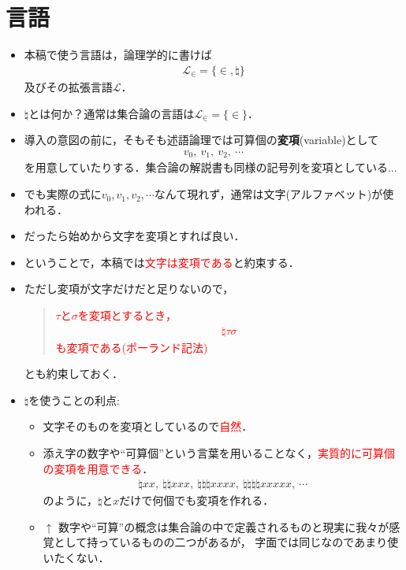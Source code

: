 \section{言語}
	\begin{itemize}
		\item 本稿で使う言語は，論理学的に書けば
			\begin{align}
				\mathcal{L}_{\in} = \{\in,\natural\}
			\end{align}
			及びその拡張言語$\mathcal{L}$．
			
		\item $\natural$とは何か？通常は集合論の言語は$\mathcal{L}_{\in} = \{\in\}$．
		
		\item 導入の意図の前に，そもそも述語論理では可算個の{\bf 変項}{(variable)}として
			\begin{align}
				v_{0},\ v_{1},\ v_{2},\ \cdots
			\end{align}
			を用意していたりする．集合論の解説書も同様の記号列を変項としている...
			
\newpage
		\item でも実際の式に$v_{0},v_{1},v_{2},\cdots$なんて現れず，通常は文字(アルファベット)が使われる．
		
		\item だったら始めから文字を変項とすれば良い．
		
		\item ということで，本稿では\textcolor{red}{文字は変項である}と約束する．
			
		\item ただし変項が文字だけだと足りないので，
			\begin{center}
				\begin{quote}
					\textcolor{red}{$\tau$と$\sigma$を変項とするとき，
					\begin{align}
						\natural \tau \sigma
					\end{align}
					も変項である(ポーランド記法)}
				\end{quote}
			\end{center}
			とも約束しておく．
	
\newpage
		\item $\natural$を使うことの利点:
			\begin{itemize}
				\item 文字そのものを変項としているので\textcolor{red}{自然}．
				\item 添え字の数字や``可算個''という言葉を用いることなく，\textcolor{red}{実質的に可算個の変項を用意できる}．
					\begin{align}
						\natural xx,\ \natural \natural xxx,\ \natural \natural \natural xxxx,\ 
						\natural \natural \natural \natural xxxxx,\ \cdots
					\end{align}
					のように，$\natural$と$x$だけで何個でも変項を作れる．
				\item $\uparrow$ 数字や``可算''の概念は集合論の中で定義されるものと現実に我々が感覚として持っているものの二つがあるが，
					字面では同じなのであまり使いたくない．
			\end{itemize}
	\end{itemize}